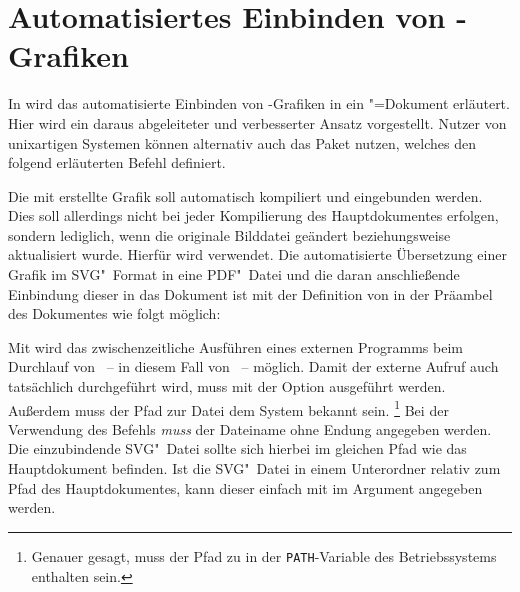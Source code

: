 \section{Automatisiertes Einbinden von -Grafiken }
\label{sec:tips:svg}
In  wird das 
automatisierte Einbinden von -Grafiken in ein 
"=Dokument erläutert. Hier wird ein daraus abgeleiteter und 
verbesserter Ansatz vorgestellt. Nutzer von unixartigen Systemen können 
alternativ auch das Paket  nutzen, welches den folgend erläuterten 
Befehl  definiert.

Die mit  erstellte Grafik soll automatisch kompiliert und 
eingebunden werden. Dies soll allerdings nicht bei jeder Kompilierung des 
Hauptdokumentes erfolgen, sondern lediglich, wenn die originale Bilddatei 
geändert beziehungsweise aktualisiert wurde. Hierfür wird  
verwendet. Die automatisierte Übersetzung einer Grafik im SVG"~Format in eine 
PDF"~Datei und die daran anschließende Einbindung dieser in das Dokument ist 
mit der Definition von  
in der Präambel des Dokumentes wie folgt möglich:
%
\makeatletter
\label{macros:includesvg}%
%
\makeatother
\begin{quoting}
\end{quoting}
%
Mit  wird das 
zwischenzeitliche Ausführen eines externen Programms beim Durchlauf von 
~-- in diesem Fall von ~-- möglich. Damit 
der externe Aufruf auch tatsächlich durchgeführt wird, muss  
mit der Option  ausgeführt werden. Außerdem muss der 
Pfad zur Datei  dem System bekannt sein.%
\footnote{%
  Genauer gesagt, muss der Pfad zu  in der 
  \texttt{PATH}-Variable des Betriebssystems enthalten sein.
}
Bei der Verwendung des Befehls  \emph{muss} der Dateiname 
ohne Endung angegeben werden. Die einzubindende SVG"~Datei sollte sich hierbei 
im gleichen Pfad wie das Hauptdokument befinden. Ist die SVG"~Datei in einem 
Unterordner relativ zum Pfad des Hauptdokumentes, kann dieser einfach mit 
 im Argument 
angegeben werden.



